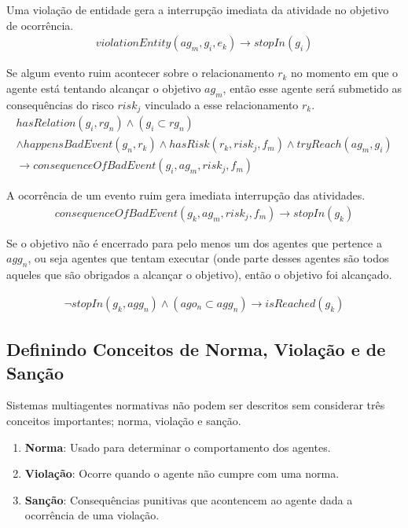 \documentclass[12pt]{article}
\begin{document}
Uma violação de entidade gera a interrupção imediata da atividade no objetivo de ocorrência.
\begin{eqnarray}\label{rel12}
	violationEntity(ag_m,g_i,e_k) \to stopIn(g_i)
\end{eqnarray}

Se algum evento ruim acontecer sobre o relacionamento $r_k$ no momento em que o agente está tentando alcançar o objetivo $ag_m$, então esse agente será submetido as consequências do risco $risk_j$ vinculado a esse relacionamento $r_k$.
\begin{eqnarray}\label{rel13}\nonumber
		hasRelation(g_i,rg_n) \wedge (g_i \subset rg_n) \nonumber \\
	\wedge happensBadEvent(g_n,r_k) \wedge hasRisk(r_k,risk_j,f_m) \wedge tryReach(ag_m,g_i) \nonumber \\ 
	\to consequenceOfBadEvent(g_i,ag_m,risk_j,f_m)
\end{eqnarray}

A ocorrência de um evento ruim gera imediata interrupção das atividades.
\begin{eqnarray}\label{rel14}
	consequenceOfBadEvent(g_k,ag_m,risk_j,f_m) \to stopIn(g_k)
\end{eqnarray}

Se o objetivo não é encerrado para pelo menos um dos agentes que pertence a $agg_n$, ou seja agentes que tentam executar (onde parte desses agentes são todos aqueles que são obrigados a alcançar o objetivo), então o objetivo foi alcançado.  

\begin{eqnarray}\label{rel15}
	\neg stopIn(g_k,agg_n) \wedge (ago_n \subset agg_n) \to isReached(g_k)
\end{eqnarray}

\subsection{Definindo Conceitos de Norma, Violação e de Sanção}

Sistemas multiagentes normativas não podem ser descritos sem considerar três conceitos importantes; norma, violação e sanção. 

\begin{enumerate}
	\item \textbf{Norma}: Usado para determinar o comportamento dos agentes.
	\item \textbf{Violação}: Ocorre quando o agente não cumpre com uma norma.
	\item \textbf{Sanção}: Consequências punitivas que acontencem ao agente dada a ocorrência de uma violação.	
\end{enumerate}
\end{document}
